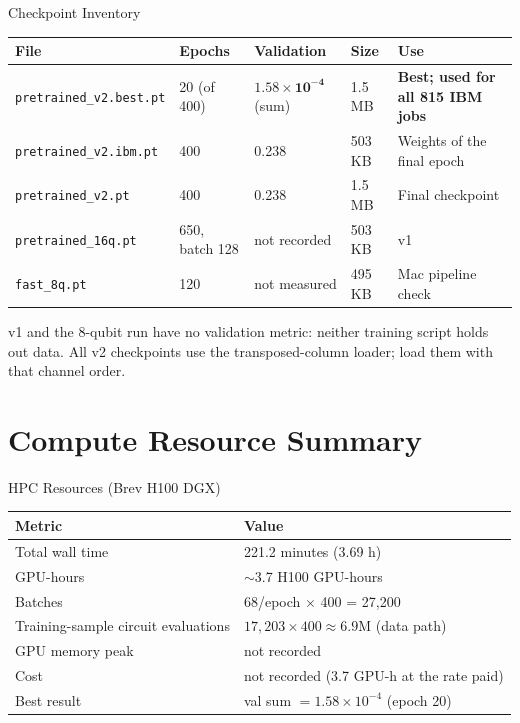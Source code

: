 \documentclass[aspectratio=169]{beamer}
\begin{document}
\begin{frame}{Checkpoint Inventory}
\begin{table}
\centering
\footnotesize
\begin{tabular}{llllp{3.6cm}}
\toprule
File & Epochs & Validation & Size & Use \\
\midrule
\texttt{pretrained\_v2.best.pt} & 20 (of 400) & $\mathbf{1.58\times10^{-4}}$ (sum) & 1.5 MB & \textbf{Best; used for all 815 IBM jobs} \\
\texttt{pretrained\_v2.ibm.pt} & 400 & 0.238 & 503 KB & Weights of the final epoch \\
\texttt{pretrained\_v2.pt} & 400 & 0.238 & 1.5 MB & Final checkpoint \\
\texttt{pretrained\_16q.pt} & 650, batch 128 & not recorded & 503 KB & v1 \\
\texttt{fast\_8q.pt} & 120 & not measured & 495 KB & Mac pipeline check \\
\bottomrule
\end{tabular}
\end{table}

\small
v1 and the 8-qubit run have no validation metric: neither training script holds out data. All v2 checkpoints use the transposed-column loader; load them with that channel order.
\end{frame}

\section{Compute Resource Summary}

\begin{frame}{HPC Resources (Brev H100 DGX)}
\begin{table}
\centering
\begin{tabular}{ll}
\toprule
Metric & Value \\
\midrule
Total wall time & 221.2 minutes (3.69 h) \\
GPU-hours & $\sim$3.7 H100 GPU-hours \\
Batches & 68/epoch $\times$ 400 = 27,200 \\
Training-sample circuit evaluations & $17{,}203 \times 400 \approx 6.9$M (data path) \\
GPU memory peak & not recorded \\
Cost & not recorded (3.7 GPU-h at the rate paid) \\
Best result & val sum $=1.58\times10^{-4}$ (epoch 20) \\
\bottomrule
\end{tabular}
\end{table}
\end{frame}
\end{document}
